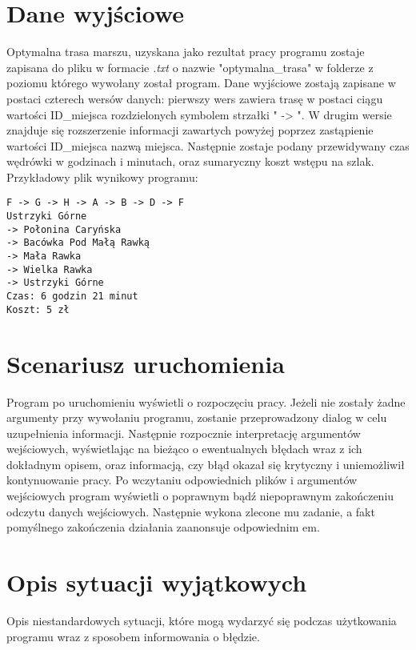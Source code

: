 \documentclass{article}
\begin{document}
\section{Dane wyjściowe}
Optymalna trasa marszu, uzyskana jako rezultat pracy programu zostaje zapisana do pliku w formacie \textit{.txt} o nazwie "optymalna\_trasa" w folderze z poziomu którego wywołany został program. Dane wyjściowe zostają zapisane w postaci czterech wersów danych: pierwszy wers zawiera trasę w postaci ciągu wartości ID\_miejsca rozdzielonych symbolem strzałki " -> ". W drugim wersie znajduje się rozszerzenie informacji zawartych powyżej poprzez zastąpienie wartości ID\_miejsca nazwą miejsca. Następnie zostaje podany przewidywany czas wędrówki w godzinach i minutach, oraz sumaryczny koszt wstępu na szlak.
\newline
Przykładowy plik wynikowy programu:
\begin{verbatim}
F -> G -> H -> A -> B -> D -> F
Ustrzyki Górne 
-> Połonina Caryńska 
-> Bacówka Pod Małą Rawką 
-> Mała Rawka 
-> Wielka Rawka 
-> Ustrzyki Górne
Czas: 6 godzin 21 minut
Koszt: 5 zł
\end{verbatim}


\section{Scenariusz uruchomienia}
Program po uruchomieniu wyświetli  o rozpoczęciu pracy. Jeżeli nie zostały żadne argumenty przy wywołaniu programu, zostanie przeprowadzony dialog w celu uzupełnienia informacji. Następnie rozpocznie interpretację argumentów wejściowych, wyświetlając na bieżąco  o ewentualnych błędach wraz z ich dokładnym opisem, oraz informacją, czy błąd okazał się krytyczny i uniemożliwił kontynuowanie pracy. Po wczytaniu odpowiednich plików i argumentów wejściowych program wyświetli  o poprawnym bądź niepoprawnym zakończeniu odczytu danych wejściowych. Następnie wykona zlecone mu zadanie, a fakt pomyślnego zakończenia działania zaanonsuje odpowiednim em.


\section{Opis sytuacji wyjątkowych}
Opis niestandardowych sytuacji, które mogą wydarzyć się podczas użytkowania programu wraz z sposobem informowania o błędzie.
\end{document}
